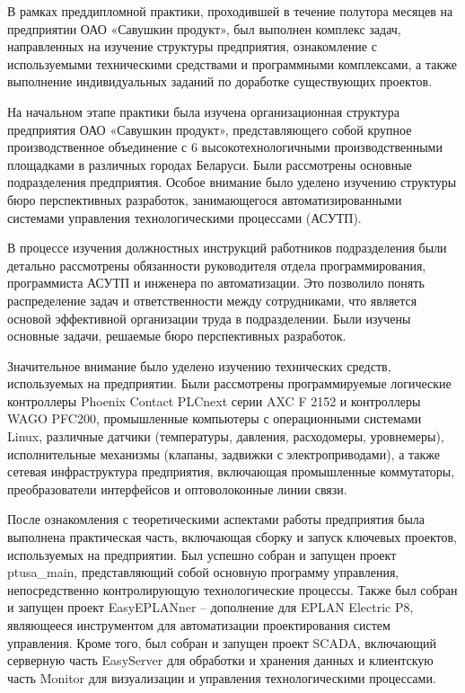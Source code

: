 {\gostFont

\par \redline В рамках преддипломной практики, проходившей в течение полутора месяцев на предприятии ОАО «Савушкин продукт», был выполнен комплекс задач, направленных на изучение структуры предприятия, ознакомление с используемыми техническими средствами и программными комплексами, а также выполнение индивидуальных заданий по доработке существующих проектов.

\par \redline На начальном этапе практики была изучена организационная структура предприятия ОАО «Савушкин продукт», представляющего собой крупное производственное объединение с 6 высокотехнологичными производственными площадками в различных городах Беларуси. Были рассмотрены основные подразделения предприятия. Особое внимание было уделено изучению структуры бюро перспективных разработок, занимающегося автоматизированными системами управления технологическими процессами (АСУТП).

\par \redline В процессе изучения должностных инструкций работников подразделения были детально рассмотрены обязанности руководителя отдела программирования, программиста АСУТП и инженера по автоматизации. Это позволило понять распределение задач и ответственности между сотрудниками, что является основой эффективной организации труда в подразделении. Были изучены основные задачи, решаемые бюро перспективных разработок.

\par \redline Значительное внимание было уделено изучению технических средств, используемых на предприятии. Были рассмотрены программируемые логические контроллеры Phoe\-nix Contact PLCnext серии AXC F 2152 и контроллеры WAGO PFC200, промышленные компьютеры с операционными системами Linux, различные датчики (температуры, давления, расходомеры, уровнемеры), исполнительные механизмы (клапаны, задвижки с электроприводами), а также сетевая инфраструктура предприятия, включающая промышленные коммутаторы, преобразователи интерфейсов и оптоволоконные линии связи.

\par \redline После ознакомления с теоретическими аспектами работы предприятия была выполнена практическая часть, включающая сборку и запуск ключевых проектов, используемых на предприятии. Был успешно собран и запущен проект ptusa\_main, представляющий собой основную программу управления, непосредственно контролирующую технологические процессы. Также был собран и запущен проект EasyEPLANner – дополнение для EPLAN Electric P8, являющееся инструментом для автоматизации проектирования систем управления. Кроме того, был собран и запущен проект SCADA, включающий серверную часть EasyServer для обработки и хранения данных и клиентскую часть Monitor для визуализации и управления технологическими процессами.

}
